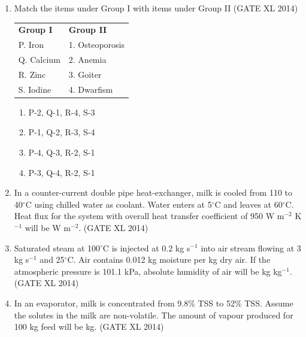 \documentclass[journal,12pt,onecolumn]{IEEEtran}
\theoremstyle{remark}
\begin{document}
\begin{enumerate}
\item Match the items under Group I with items under Group II
\hfill (GATE XL 2014)\\

\begin{tabular}{ll}
\textbf{Group I} & \textbf{Group II} \\
P. Iron & 1. Osteoporosis \\
Q. Calcium & 2. Anemia \\
R. Zinc & 3. Goiter \\
S. Iodine & 4. Dwarfism \\
\end{tabular}

\begin{multicols}{2}
\begin{enumerate}
\item P-2, Q-1, R-4, S-3
\item P-1, Q-2, R-3, S-4
\item P-4, Q-3, R-2, S-1
\item P-3, Q-4, R-2, S-1
\end{enumerate}
\end{multicols}

\item In a counter-current double pipe heat-exchanger, milk is cooled from 110 to 40$^\circ$C using chilled water as coolant. Water enters at 5$^\circ$C and leaves at 60$^\circ$C. Heat flux for the system with overall heat transfer coefficient of 950 W m$^{-2}$ K$^{-1}$ will be \underline{\hspace{3cm}} W m$^{-2}$.
\hfill (GATE XL 2014)\\


\item Saturated steam at 100$^\circ$C is injected at 0.2 kg s$^{-1}$ into air stream flowing at 3 kg s$^{-1}$ and 25$^\circ$C. Air contains 0.012 kg moisture per kg dry air. If the atmospheric pressure is 101.1 kPa, absolute humidity of air will be \underline{\hspace{3cm}} kg kg$^{-1}$.
\hfill (GATE XL 2014)\\


\item In an evaporator, milk is concentrated from 9.8\% TSS to 52\% TSS. Assume the solutes in the milk are non-volatile. The amount of vapour produced for 100 kg feed will be \underline{\hspace{3cm}} kg.
\hfill (GATE XL 2014)\\



\end{enumerate}
\end{document}
